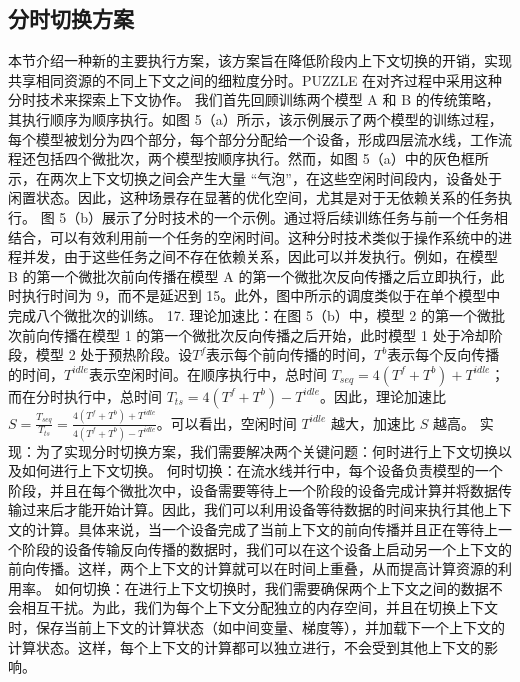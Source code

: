 \subsection{分时切换方案}
本节介绍一种新的主要执行方案，该方案旨在降低阶段内上下文切换的开销，实现共享相同资源的不同上下文之间的细粒度分时。PUZZLE 在对齐过程中采用这种分时技术来探索上下文协作。 
我们首先回顾训练两个模型 A 和 B 的传统策略，其执行顺序为顺序执行。如图 5（a）所示，该示例展示了两个模型的训练过程，每个模型被划分为四个部分，每个部分分配给一个设备，形成四层流水线，工作流程还包括四个微批次，两个模型按顺序执行。然而，如图 5（a）中的灰色框所示，在两次上下文切换之间会产生大量 “气泡”，在这些空闲时间段内，设备处于闲置状态。因此，这种场景存在显著的优化空间，尤其是对于无依赖关系的任务执行。 
图 5（b）展示了分时技术的一个示例。通过将后续训练任务与前一个任务相结合，可以有效利用前一个任务的空闲时间。这种分时技术类似于操作系统中的进程并发，由于这些任务之间不存在依赖关系，因此可以并发执行。例如，在模型 B 的第一个微批次前向传播在模型 A 的第一个微批次反向传播之后立即执行，此时执行时间为 9，而不是延迟到 15。此外，图中所示的调度类似于在单个模型中完成八个微批次的训练。 
17.	理论加速比：在图 5（b）中，模型 2 的第一个微批次前向传播在模型 1 的第一个微批次反向传播之后开始，此时模型 1 处于冷却阶段，模型 2 处于预热阶段。设\(T^{f}\)表示每个前向传播的时间，\(T^{b}\)表示每个反向传播的时间，\(T^{idle}\)表示空闲时间。在顺序执行中，总时间 \(T_{seq} = 4(T^{f} + T^{b}) + T^{idle}\)；而在分时执行中，总时间 \(T_{ts} = 4(T^{f} + T^{b}) - T^{idle}\)。因此，理论加速比 \(S = \frac{T_{seq}}{T_{ts}}=\frac{4(T^{f} + T^{b}) + T^{idle}}{4(T^{f} + T^{b}) - T^{idle}}\)。可以看出，空闲时间 \(T^{idle}\) 越大，加速比 \(S\) 越高。
实现：为了实现分时切换方案，我们需要解决两个关键问题：何时进行上下文切换以及如何进行上下文切换。
何时切换：在流水线并行中，每个设备负责模型的一个阶段，并且在每个微批次中，设备需要等待上一个阶段的设备完成计算并将数据传输过来后才能开始计算。因此，我们可以利用设备等待数据的时间来执行其他上下文的计算。具体来说，当一个设备完成了当前上下文的前向传播并且正在等待上一个阶段的设备传输反向传播的数据时，我们可以在这个设备上启动另一个上下文的前向传播。这样，两个上下文的计算就可以在时间上重叠，从而提高计算资源的利用率。
如何切换：在进行上下文切换时，我们需要确保两个上下文之间的数据不会相互干扰。为此，我们为每个上下文分配独立的内存空间，并且在切换上下文时，保存当前上下文的计算状态（如中间变量、梯度等），并加载下一个上下文的计算状态。这样，每个上下文的计算都可以独立进行，不会受到其他上下文的影响。
